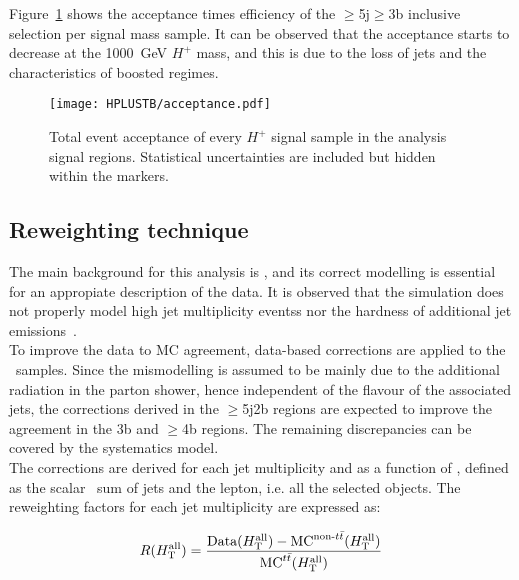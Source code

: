 Figure~\ref{Hplustb:acceptance} shows the acceptance times efficiency of the $\geq$5j$\geq$3b inclusive selection per signal mass sample. It can be observed that the acceptance starts to decrease at the 1000~GeV $H^+$ mass, and this is due to the loss of jets and the characteristics of boosted regimes.

\begin{figure}[htbp]
    \RawFloats
    \begin{center}
    \texttt{[image: HPLUSTB/acceptance.pdf]}
    \caption{
        Total event acceptance of every $H^+$ signal sample in the analysis signal regions. Statistical uncertainties are included but hidden within the markers.
    }
    \label{Hplustb:acceptance}
    \end{center}
\end{figure}

\clearpage
\subsection{Reweighting technique}
\label{Hplustb:secRW}
The main background for this analysis is \ttjets, and its correct modelling is essential for an appropiate description of the data. It is observed that the simulation does not properly model high jet multiplicity eventss nor the hardness of additional jet emissions~\cite{ATL-PHYS-PUB-2018-009,10.1007/JHEP01(2021)033}.\\

To improve the data to MC agreement, data-based corrections are applied to the \ttbar\ samples. Since the mismodelling is assumed to be mainly due to the additional radiation in the parton shower, hence independent of the flavour of the associated jets, the corrections derived in the $\geq$5j2b regions are expected to improve the agreement in the 3b and $\geq$4b regions. The remaining discrepancies can be covered by the systematics model.\\

The corrections are derived for each jet multiplicity and as a function of \HTall, defined as the scalar \pT\ sum of jets and the lepton, i.e. all the selected objects. The reweighting factors for each jet multiplicity are expressed as:

\begin{equation}
    \label{Hplustb:RWeq}
    R(H_{\text{T}}^{\text{all}})=\frac{ \text{Data}(H_{\text{T}}^{\text{all}}) - \text{MC}^{\text{non-\ensuremath{t\bar{t}}}}(H_{\text{T}}^{\text{all}}) }{\text{MC}^{\text{\ensuremath{t\bar{t}}}}(H_{\text{T}}^{\text{all}})}
\end{equation}

